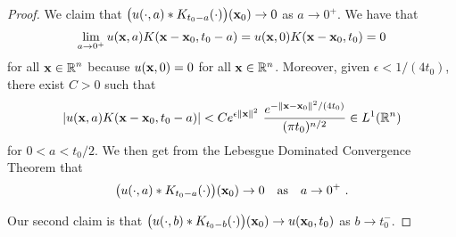 \begin{proof}
 We claim that
$\displaystyle \big(u(\cdot, a) \ast K_{t_0-a}(\cdot)\big)(\mathbf{x}_0) \to 0$
as $a \to 0^+$.  We have that
\[
\lim_{a\to 0^+} u(\mathbf{x},a) K(\mathbf{x}-\mathbf{x}_0, t_0 - a) =
u(\mathbf{x},0) K(\mathbf{x}-\mathbf{x}_0, t_0) = 0
\]
for all $\displaystyle \mathbf{x} \in \mathbb{R}^n$ because $u(\mathbf{x},0) = 0$
for all $\mathbf{x} \in \mathbb{R}^n$.  Moreover, given
$\epsilon < 1/(4t_0)$, there exist $C>0$ such that
\[
\left| u(\mathbf{x},a) K(\mathbf{x}-\mathbf{x}_0, t_0 - a) \right|
< C e^{\epsilon \|\mathbf{x}\|^2}
\ \frac{e^{-\|\mathbf{x}-\mathbf{x}_0\|^2/(4t_0)}}{(\pi t_0)^{n/2}} \in L^1(\mathbb{R}^n)
\]
for $0<a< t_0/2$.  We then get from the
Lebesgue Dominated Convergence Theorem that
\begin{equation} \label{heat_unicC}
\big(u(\cdot, a) \ast K_{t_0-a}(\cdot)\big)(\mathbf{x}_0)
\to 0 \quad \text{as}\quad a \to 0^+ \ .
\end{equation}

 Our second claim is that
$\displaystyle \big(u(\cdot, b) \ast K_{t_0-b}(\cdot)\big)(\mathbf{x}_0) \to
u(\mathbf{x}_0,t_0)$ as $b \to t_0^-$.


\end{proof}
